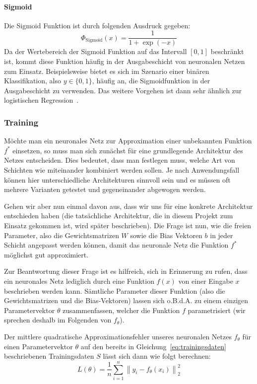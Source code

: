 \paragraph{Sigmoid} Die Sigmoid Funktion ist durch folgenden Ausdruck gegeben:
\begin{equation*}
    \Phi_\text{Sigmoid}(x) = \frac{1}{1 + \exp{(-x)}}
\end{equation*}
Da der Wertebereich der Sigmoid Funktion auf das Intervall $[0, 1]$
beschr\"ankt ist, kommt diese Funktion h\"aufig in der Ausgabeschicht
von neuronalen Netzen zum Einsatz. Beispielsweise bietet es sich im
Szenario einer bin\"aren Klassifikation, also $y \in \{0, 1\}$, h\"aufig
an, die Sigmoidfunktion in der Ausgabeschicht zu verwenden.
Das weitere Vorgehen ist dann sehr \"ahnlich zur
logistischen Regression~\cite{statistical_learning}.

\subsubsection{Training}
\label{sec:training}

M\"ochte man ein neuronales Netz zur Approximation einer unbekannten
Funktion $f^*$ einsetzen, so muss man sich zun\"achst f\"ur eine
grundlegende Architektur des Netzes entscheiden.
Dies bedeutet, dass man festlegen muss, welche Art von Schichten wie
miteinander kombiniert werden sollen.
Je nach Anwendungsfall k\"onnen hier unterschiedliche Architekturen
sinnvoll sein und es m\"ussen oft mehrere Varianten getestet und
gegeneinander abgewogen werden.

Gehen wir aber nun einmal davon aus, dass wir uns f\"ur eine konkrete
Architektur entschieden haben (die tats\"achliche Architektur, die in
diesem Projekt zum Einsatz gekommen ist, wird sp\"ater beschrieben).
Die Frage ist nun, wie die freien Parameter, also die
Gewichtsmatrizen $W$ sowie die Bias Vektoren $b$ in jeder Schicht angepasst
werden k\"onnen, damit das neuronale Netz die Funktion $f^*$ m\"oglichst
gut approximiert.

Zur Beantwortung dieser Frage ist es hilfreich, sich in Erinnerung
zu rufen, dass ein neuronales Netz lediglich durch eine Funktion
$f(x)$ von einer Eingabe $x$ beschrieben werden kann.
S\"amtliche Parameter dieser Funktion (also die Gewichtsmatrizen und
die Bias-Vektoren) lassen sich o.B.d.A. zu einem einzigen
Parametervektor $\theta$ zusammenfassen, welcher die Funktion $f$
parametrisiert (wir sprechen deshalb im Folgenden von $f_\theta$).

Der mittlere quadratische Approximationsfehler unseres neuronalen Netzes
$f_\theta$ f\"ur einen Parametervektor $\theta$ auf den bereits
in Gleichung~\ref{eq:trainingsdaten} beschriebenen Trainingsdaten $S$
l\"asst sich dann wie folgt berechnen:
\begin{equation}
    L(\theta) = \frac{1}{n} \sum_{i=1}^n \left\lVert y_i - f_\theta(x_i) \right\lVert_2^2
\end{equation}

